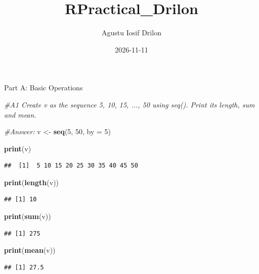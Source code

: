 \documentclass[
]{article}
\title{RPractical\_Drilon}
\author{Agustu Iosif Drilon}
\date{2026-11-11}
\newenvironment{Shaded}{\begin{snugshade}}{\end{snugshade}}
\newcommand{\AttributeTok}[1]{\textcolor[rgb]{0.13,0.29,0.53}{#1}}
\newcommand{\CommentTok}[1]{\textcolor[rgb]{0.56,0.35,0.01}{\textit{#1}}}
\newcommand{\DecValTok}[1]{\textcolor[rgb]{0.00,0.00,0.81}{#1}}
\newcommand{\FunctionTok}[1]{\textcolor[rgb]{0.13,0.29,0.53}{\textbf{#1}}}
\newcommand{\NormalTok}[1]{#1}
\newcommand{\OtherTok}[1]{\textcolor[rgb]{0.56,0.35,0.01}{#1}}
\begin{document}
\maketitle

Part A: Basic Operations

\begin{Shaded}
\begin{Highlighting}[]
\CommentTok{\#A1 Create v as the sequence 5, 10, 15, ..., 50 using seq(). Print its length, sum and mean.}

\CommentTok{\#Answer: }
\NormalTok{v }\OtherTok{\textless{}{-}} \FunctionTok{seq}\NormalTok{(}\DecValTok{5}\NormalTok{, }\DecValTok{50}\NormalTok{, }\AttributeTok{by =} \DecValTok{5}\NormalTok{)}

\FunctionTok{print}\NormalTok{(v)}
\end{Highlighting}
\end{Shaded}

\begin{verbatim}
##  [1]  5 10 15 20 25 30 35 40 45 50
\end{verbatim}

\begin{Shaded}
\begin{Highlighting}[]
\FunctionTok{print}\NormalTok{(}\FunctionTok{length}\NormalTok{(v))}
\end{Highlighting}
\end{Shaded}

\begin{verbatim}
## [1] 10
\end{verbatim}

\begin{Shaded}
\begin{Highlighting}[]
\FunctionTok{print}\NormalTok{(}\FunctionTok{sum}\NormalTok{(v))}
\end{Highlighting}
\end{Shaded}

\begin{verbatim}
## [1] 275
\end{verbatim}

\begin{Shaded}
\begin{Highlighting}[]
\FunctionTok{print}\NormalTok{(}\FunctionTok{mean}\NormalTok{(v))}
\end{Highlighting}
\end{Shaded}

\begin{verbatim}
## [1] 27.5
\end{verbatim}
\end{document}
